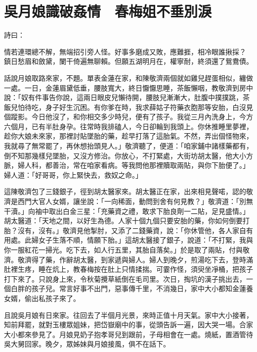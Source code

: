 %

\chapter{吳月娘識破姦情　春梅姐不垂別淚}

詩曰：

情若連環總不解，無端招引旁人怪。好事多磨成又敗，應難捱，相冷眼誰揪採？
鎮日愁眉和斂黛，闌干倚遍無聊賴。但願五湖明月在，權寧耐，終須還了鴛鴦債。

話說月娘取路來家，不題。單表金蓮在家，和陳敬濟兩個就如雞兒趕蛋相似，纏做一處。一日，金蓮眉黛低垂，腰肢寬大，終日懨懨思睡，茶飯懶咽，教敬濟到房中說：「奴有件事告你說，這兩日眼皮兒懶待開，腰肢兒漸漸大，肚腹中撲撲跳，茶飯兒怕待吃，身子好生沉困。有你爹在時，我求薛姑子符藥衣胞那等安胎，白沒見個蹤影。今日他沒了，和你相交多少時兒，便有了孩子。我從三月內洗身上，今方六個月，已有半肚身孕。往常時我排磕人，今日卻輪到我頭上。你休推睡里夢裡，趁你大娘未來家，那裡討貼墜胎的藥，趁早打落了這胎氣。不然，弄出個怪物來，我就尋了無常罷了，再休想抬頭見人。」敬濟聽了，便道：「咱家鋪中諸樣藥都有，倒不知那幾樣兒墜胎，又沒方修治。你放心，不打緊處，大街坊胡太醫，他大小方脈，婦人科，都善治，常在咱家看病。等我問他那裡贖取兩貼，與你下胎便了。」婦人道：「好哥哥，你上緊快去，救奴之命。」

這陳敬濟包了三錢銀子，徑到胡太醫家來。胡太醫正在家，出來相見聲喏，認的敬濟是西門大官人女婿，讓坐說：「一向稀面，動問到舍有何見教？」敬濟道：「別無干瀆。」向袖中取出白金三星：「充藥資之禮，敢求下胎良劑一二貼，足見盛情。」胡太醫道：「天地之間，以好生為德。人家十個九個只要安胎的藥，你如何倒要打胎？沒有，沒有。」敬濟見他掣肘，又添了二錢藥資，說：「你休管他，各人家自有用處。此婦女子生落不順，情願下胎。」這胡太醫接了銀子，說道：「不打緊，我與你一服紅花一掃光。吃下去，如人行五里，其胎自落矣。」於是取了兩貼，付與敬濟。敬濟得了藥，作辭胡太醫，到家遞與婦人。婦人到晚夕，煎湯吃下去，登時滿肚裡生疼，睡在炕上，教春梅按在肚上只情揉揣。可霎作怪，須臾坐凈桶，把孩子打下來了。只說身上來，令秋菊攪草紙倒在毛司里。次日，掏坑的漢子挑出去，一個白胖的孩子兒。常言好事不出門，惡事傳千里，不消幾日，家中大小都知金蓮養女婿，偷出私孩子來了。

且說吳月娘有日來家。往回去了半個月光景，來時正值十月天氣。家中大小接著，知前拜罷，就對玉樓眾姐妹，把岱嶽廟中的事，從頭告訴一遍，因大哭一場。合家大小都來參見了。月娘見奶子抱孝哥兒到跟前，子母相會在一處。燒紙，置酒管待吳大舅回家。晚夕，眾姊妹與月娘接風，俱不在話下。


